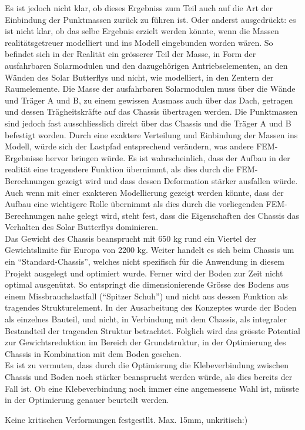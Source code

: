 Es ist jedoch nicht klar, ob dieses Ergebniss zum Teil auch auf die Art der Einbindung der Punktmassen zurück zu führen ist. Oder anderst ausgedrückt: es ist nicht klar, ob das selbe Ergebnis erzielt werden könnte, wenn die Massen realitätsgetreuer modelliert und ins Modell eingebunden worden wären. So befindet sich in der Realität ein grösserer Teil der Masse, in Form der ausfahrbaren Solarmodulen und den dazugehörigen Antriebselementen, an den Wänden des Solar Butterflys und nicht, wie modelliert, in den Zentern der Raumelemente.
Die Masse der ausfahrbaren Solarmodulen muss über die Wände und Träger A und B, zu einem gewissen Ausmass auch über das Dach, getragen und dessen Trägheitskräfte auf das Chassis übertragen werden. Die Punktmassen sind jedoch fast ausschliesslich direkt über das Chassis und die Träger A und B befestigt worden. Durch eine exaktere Verteilung und Einbindung der Massen ins Modell, würde sich der Lastpfad entsprechend verändern, was andere FEM-Ergebnisse hervor bringen würde.
Es ist wahrscheinlich, dass der Aufbau in der realität eine tragendere Funktion übernimmt, als dies durch die FEM-Berechnungen gezeigt wird und dass dessen Deformation stärker ausfallen würde.\\
Auch wenn mit einer exakteren Modellierung gezeigt werden könnte, dass der Aufbau eine wichtigere Rolle übernimmt als dies durch die vorliegenden FEM-Berechnungen nahe gelegt wird, steht fest, dass die Eigenschaften des Chassis das Verhalten des Solar Butterflys dominieren.\\

Das Gewicht des Chassis beansprucht mit 650 kg rund ein Viertel der Gewichtslimite für Europa von 2200 kg. Weiter handelt es sich beim Chassis um ein ``Standard-Chassis'', welches nicht spezifisch für die Anwendung in diesem Projekt ausgelegt und optimiert wurde. Ferner wird der Boden zur Zeit nicht optimal ausgenützt. So entspringt die dimensionierende Grösse des Bodens aus einem Missbrauchslastfall (``Spitzer Schuh'') und nicht aus dessen Funktion als tragendes Strukturelement. In der Ausarbeitung des Konzeptes wurde der Boden als einzelnes Bauteil, und nicht, in Verbindung mit dem Chassis, als integraler Bestandteil der tragenden Struktur betrachtet. Folglich wird das grösste Potential zur Gewichtsreduktion im Bereich der Grundstruktur, in der Optimierung des Chassis in Kombination mit dem Boden gesehen.\\
Es ist zu vermuten, dass durch die Optimierung die Klebeverbindung zwischen Chassis und Boden noch stärker beansprucht werden würde, als dies bereits der Fall ist. Ob eine Klebeverbindung noch immer eine angemessene Wahl ist, müsste in der Optimierung genauer beurteilt werden.

Keine kritischen Verformungen festgestllt. Max. 15mm, unkritisch:)
\newpage
